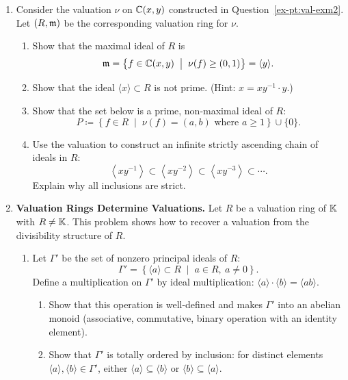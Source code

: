 \documentclass[12pt,reqno]{amsart}
\begin{document}
\begin{enumerate}[leftmargin=*]
 \item Consider the valuation $\nu$ on $\mathbb{C}(x,y)$ constructed in Question~\ref{ex-pt:val-exm2}. Let $(R,\mathfrak{m})$ be the corresponding valuation ring for $\nu$.
  \begin{enumerate}[label=(\alph*),ref=\theenumi\alph*]
 	\item Show that the maximal ideal of $R$ is
	\[
	\mathfrak{m} = \left\{f \in \mathbb{C}(x,y) \;\; \big| \;\; \nu(f) \geq  (0, 1)\right\} = \langle y \rangle.
	\]
 	\item Show that the ideal  $\langle x\rangle \subset R$ is not prime. (Hint: $x = xy^{-1}\cdot y$.)
	\item Show that the set below is a prime, non-maximal ideal of $R$:
	\[
	P \coloneqq \left \{ f \in R \;\; \big | \;\; \nu(f) = (a,b) \text{ where } a \geq 1 \right\}\cup\{0\}.
	\] 
 	\item Use the valuation to construct an infinite strictly ascending chain of ideals in $R$:
	\[
	\left\langle xy^{-1} \right\rangle \subset \left\langle xy^{-2} \right\rangle \subset \left\langle xy^{-3}  \right\rangle \subset \cdots.
	\]
	Explain why all inclusions are strict.
  \end{enumerate}

     
\item \textbf{Valuation Rings Determine Valuations.}
Let $R$ be a valuation ring of $\mathbb{K}$ with $R \neq \mathbb{K}$. This problem shows how to recover a valuation from the divisibility structure of $R$.

\begin{enumerate}[label=(\alph*),ref=\theenumi\alph*]
	\item Let $\Gamma'$ be the set of nonzero principal ideals of $R$:
	\[
	\Gamma' = \left\{\langle a\rangle \subset R \;\; \big|\;\; a \in R,\ a \neq 0\right\}.
	\]
	Define a multiplication on $\Gamma'$ by ideal multiplication: $\langle a\rangle \cdot \langle b\rangle = \langle ab\rangle$.
	\begin{enumerate}
		\item Show that this operation is well-defined and makes $\Gamma'$ into an abelian monoid (associative, commutative, binary operation with an identity element).
		\item Show that $\Gamma'$ is totally ordered by inclusion: for distinct elements $\langle a\rangle,\langle b\rangle \in \Gamma'$, either $\langle a\rangle \subseteq \langle b\rangle$ or $\langle b\rangle \subseteq \langle a\rangle$.
		\end{enumerate}


\end{enumerate}
\end{enumerate}
\end{document}
